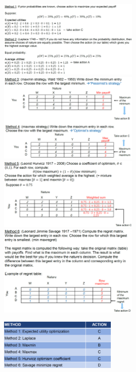 \begin{figure}[H]
    \centering
    \includegraphics[width=0.6\textwidth]{Pictures/method_1_and_2.png}
    \includegraphics[width=0.6\textwidth]{Pictures/Method_3_and_4.png}
    \includegraphics[width=0.6\textwidth]{Pictures/method_5.png}
    \includegraphics[width=0.6\textwidth]{Pictures/method_6.png}
\end{figure}

\begin{figure}[H]
    \centering
    \includegraphics[width=0.5\textwidth]{Pictures/results_method.png}
\end{figure}

